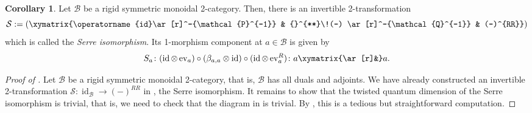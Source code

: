 \documentclass{article}
\newcommand{\id}{\operatorname{id}}%
\newcommand{\ev}{\operatorname{ev}}%
\newcommand{\B}{\mathcal{B}}
\numberwithin{equation}{section}
\theoremstyle{definition}
\newtheorem{corollary}[definition]{Corollary}
\theoremstyle{theorem}
\begin{document}
\begin{corollary}\label{Corollary: the Serre isomorphism}
    Let $\B$ be a rigid symmetric monoidal 2-category. Then, there is an invertible 2-transformation
    \begin{equation}
        \mathcal{S} := \left(\xymatrix{\id \ar[r]^-{\mathcal{P}^{-1}} & {}^{**}\!(-) \ar[r]^-{\mathcal{Q}^{-1}} & (-)^{RR}} \right)
    \end{equation}
    which is called the \emph{Serre isomorphism}. Its 1-morphism component at $a \in \B$ is given by 
    \begin{equation}
        S_a \colon (\id \otimes \ev_a) \circ (\beta_{a,a} \otimes \id) \circ (\id \otimes \ev^R_a) \colon a \xymatrix{\ar[r]&} a.
    \end{equation}
\end{corollary}
\begin{proof}[Proof of ]
    Let $\B$ be a rigid symmetric monoidal 2-category, that is, $\B$ has all duals and adjoints. We have already constructed an invertible 2-transformation 
    $\mathcal{S} \colon \id_{\B} \to (-)^{RR}$ in , the Serre isomorphism. It remains to show that the twisted 
    quantum dimension of the Serre isomorphism is trivial, that is, we need to check that the diagram in  is trivial. By 
    , this is a tedious but straightforward computation.
\end{proof}
\end{document}
